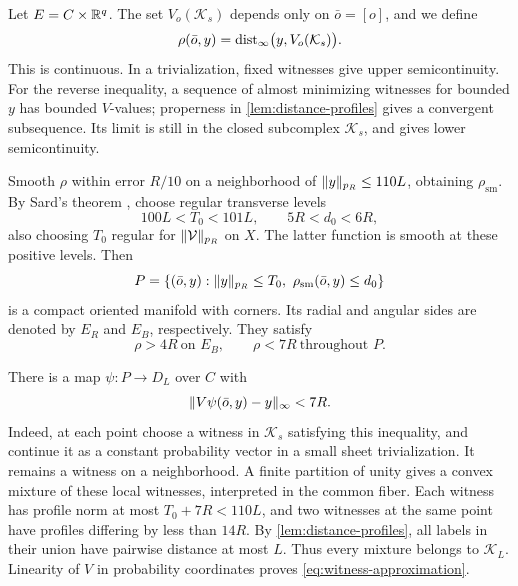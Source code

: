 Let $E=C\times\mathbb R^q$.  The set $V_o(\mathcal K_s)$ depends only on
$\bar o=[o]$, and we define
\[
 \rho(\bar o,y)=\operatorname{dist}_\infty\bigl(y,V_o(\mathcal K_s)\bigr).
\]
This is continuous.  In a trivialization, fixed witnesses give upper
semicontinuity.  For the reverse inequality, a sequence of almost
minimizing witnesses for bounded $y$ has bounded $V$-values; properness
in \cref{lem:distance-profiles} gives a convergent subsequence.  Its
limit is still in the closed subcomplex $\mathcal K_s$, and gives
lower semicontinuity.

Smooth $\rho$ within error $R/10$ on a neighborhood of
$\lVert y\rVert_{p_R}\le110L$, obtaining $\rho_{\mathrm{sm}}$.  By Sard's
theorem \cite{Sard1942}, choose regular transverse levels
\begin{equation}
\label{eq:triad-levels}
 100L<T_0<101L,
 \qquad 5R<d_0<6R,
\end{equation}
also choosing $T_0$ regular for $\lVert\mathcal V\rVert_{p_R}$ on $X$.
The latter function is smooth at these positive levels.  Then
\begin{equation}
\label{eq:compact-triad}
 P=\{(\bar o,y):\lVert y\rVert_{p_R}\le T_0,
                         \ \rho_{\mathrm{sm}}(\bar o,y)\le d_0\}
\end{equation}
is a compact oriented manifold with corners.  Its radial and angular
sides are denoted by $E_R$ and $E_B$, respectively.  They satisfy
\begin{equation}
\label{eq:triad-gaps}
 \rho>4R\ \text{on }E_B,
 \qquad \rho<7R\ \text{throughout }P.
\end{equation}

There is a map $\psi:P\to D_L$ over $C$ with
\begin{equation}
\label{eq:witness-approximation}
 \lVert V\psi(\bar o,y)-y\rVert_\infty<7R.
\end{equation}
Indeed, at each point choose a witness in $\mathcal K_s$ satisfying
this inequality, and continue it as a constant probability vector in
a small sheet trivialization.  It remains a witness on a neighborhood.
A finite partition of unity gives a convex mixture of these local
witnesses, interpreted in the common fiber.  Each witness has profile
norm at most $T_0+7R<110L$, and two witnesses at the same point have
profiles differing by less than $14R$.  By
\cref{lem:distance-profiles}, all labels in their union have pairwise
distance at most $L$.  Thus every mixture belongs to
$\mathcal K_L$.  Linearity of $V$ in probability coordinates proves
\cref{eq:witness-approximation}.

